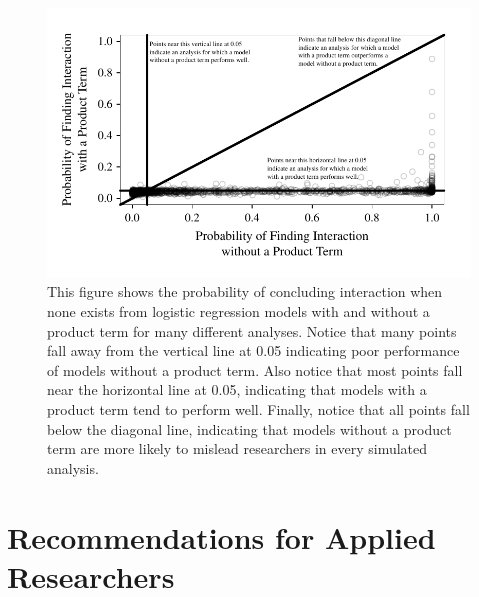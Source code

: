 \documentclass[12pt]{article}
\begin{document}
\begin{figure}[H]
\begin{center}
\includegraphics[scale = .9]{fig/fig-scatter2.pdf}
\end{center}\caption{This figure shows the probability of concluding interaction when none exists from logistic regression models with and without a product term for many different analyses. Notice that many points fall away from the vertical line at 0.05 indicating poor performance of models without a product term. Also notice that most points fall near the horizontal line at 0.05, indicating that models with a product term tend to perform well. Finally, notice that  all points fall below the diagonal line, indicating that models without a product term are more likely to mislead researchers in every simulated analysis.}\label{fig:scatter}
\end{figure}

\section*{Recommendations for Applied Researchers}
\end{document}
